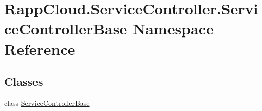 \hypertarget{namespaceRappCloud_1_1ServiceController_1_1ServiceControllerBase}{\section{Rapp\-Cloud.\-Service\-Controller.\-Service\-Controller\-Base Namespace Reference}
\label{namespaceRappCloud_1_1ServiceController_1_1ServiceControllerBase}
}
\subsection*{Classes}
\begin{DoxyCompactItemize}
\item 
class \hyperlink{classRappCloud_1_1ServiceController_1_1ServiceControllerBase_1_1ServiceControllerBase}{Service\-Controller\-Base}
\end{DoxyCompactItemize}
